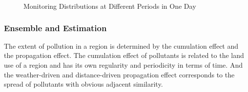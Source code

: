 \documentclass[twoside,leqno,twocolumn]{article}
\begin{document}
\begin{figure}[htbp]
\small
{}

\caption{Monitoring Distributions at Different Periods in One Day}
\label{fig:Sampling}
\end{figure}


\subsubsection{Ensemble and Estimation}
The extent of pollution in a region is determined by the cumulation effect and the propagation effect. The cumulation effect of pollutants is related to the land use of a region and has its own regularity and periodicity in terms of time.
And the weather-driven and distance-driven propagation effect corresponds to the spread of pollutants with obvious adjacent similarity.
\end{document}
